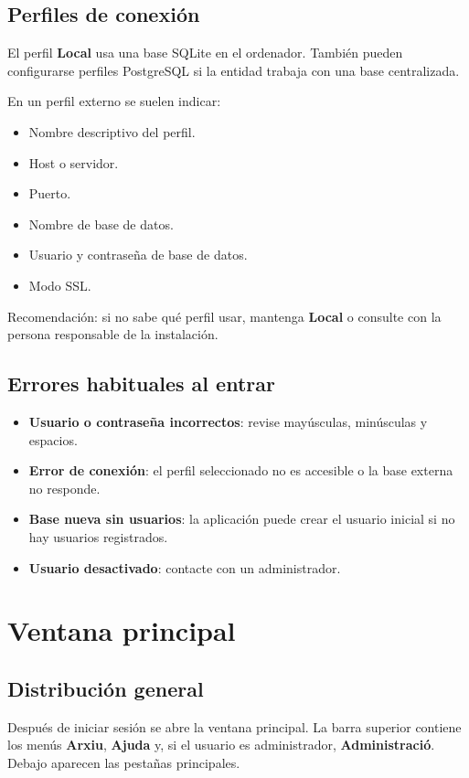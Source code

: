 \documentclass[12pt]{article}
\newcommand{\menu}[1]{\textbf{#1}}
\begin{document}
\subsection{Perfiles de conexión}
El perfil \menu{Local} usa una base SQLite en el ordenador. También pueden configurarse perfiles PostgreSQL si la entidad trabaja con una base centralizada.

En un perfil externo se suelen indicar:
\begin{itemize}
  \item Nombre descriptivo del perfil.
  \item Host o servidor.
  \item Puerto.
  \item Nombre de base de datos.
  \item Usuario y contraseña de base de datos.
  \item Modo SSL.
\end{itemize}

Recomendación: si no sabe qué perfil usar, mantenga \menu{Local} o consulte con la persona responsable de la instalación.

\subsection{Errores habituales al entrar}
\begin{itemize}
  \item \textbf{Usuario o contraseña incorrectos}: revise mayúsculas, minúsculas y espacios.
  \item \textbf{Error de conexión}: el perfil seleccionado no es accesible o la base externa no responde.
  \item \textbf{Base nueva sin usuarios}: la aplicación puede crear el usuario inicial si no hay usuarios registrados.
  \item \textbf{Usuario desactivado}: contacte con un administrador.
\end{itemize}

\section{Ventana principal}
\subsection{Distribución general}
Después de iniciar sesión se abre la ventana principal. La barra superior contiene los menús \menu{Arxiu}, \menu{Ajuda} y, si el usuario es administrador, \menu{Administració}. Debajo aparecen las pestañas principales.
\end{document}
